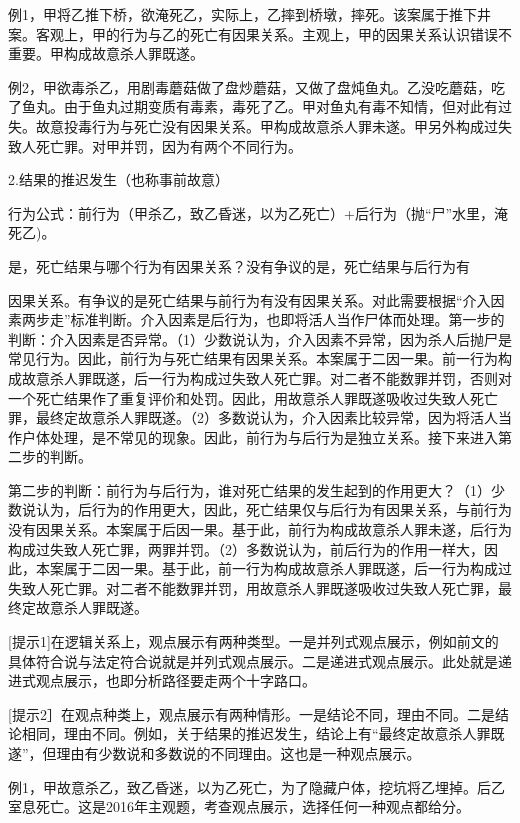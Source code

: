 例1，甲将乙推下桥，欲淹死乙，实际上，乙摔到桥墩，摔死。该案属于推下井案。客观上，甲的行为与乙的死亡有因果关系。主观上，甲的因果关系认识错误不重要。甲构成故意杀人罪既遂。

例2，甲欲毒杀乙，用剧毒蘑菇做了盘炒蘑菇，又做了盘炖鱼丸。乙没吃蘑菇，吃了鱼丸。由于鱼丸过期变质有毒素，毒死了乙。甲对鱼丸有毒不知情，但对此有过失。故意投毒行为与死亡没有因果关系。甲构成故意杀人罪未遂。甲另外构成过失致人死亡罪。对甲并罚，因为有两个不同行为。

2.结果的推迟发生（也称事前故意）

行为公式：前行为（甲杀乙，致乙昏迷，以为乙死亡）+后行为（抛“尸”水里，淹死乙)。

是，死亡结果与哪个行为有因果关系？没有争议的是，死亡结果与后行为有

因果关系。有争议的是死亡结果与前行为有没有因果关系。对此需要根据“介入因素两步走”标准判断。介入因素是后行为，也即将活人当作尸体而处理。第一步的判断：介入因素是否异常。（1）少数说认为，介入因素不异常，因为杀人后抛尸是常见行为。因此，前行为与死亡结果有因果关系。本案属于二因一果。前一行为构成故意杀人罪既遂，后一行为构成过失致人死亡罪。对二者不能数罪并罚，否则对一个死亡结果作了重复评价和处罚。因此，用故意杀人罪既遂吸收过失致人死亡罪，最终定故意杀人罪既遂。（2）多数说认为，介入因素比较异常，因为将活人当作户体处理，是不常见的现象。因此，前行为与后行为是独立关系。接下来进入第二步的判断。

第二步的判断：前行为与后行为，谁对死亡结果的发生起到的作用更大？（1）少数说认为，后行为的作用更大，因此，死亡结果仅与后行为有因果关系，与前行为没有因果关系。本案属于后因一果。基于此，前行为构成故意杀人罪未遂，后行为构成过失致人死亡罪，两罪并罚。（2）多数说认为，前后行为的作用一样大，因此，本案属于二因一果。基于此，前一行为构成故意杀人罪既遂，后一行为构成过失致人死亡罪。对二者不能数罪并罚，用故意杀人罪既遂吸收过失致人死亡罪，最终定故意杀人罪既遂。


[提示1]在逻辑关系上，观点展示有两种类型。一是并列式观点展示，例如前文的具体符合说与法定符合说就是并列式观点展示。二是递进式观点展示。此处就是递进式观点展示，也即分析路径要走两个十字路口。

[提示2］在观点种类上，观点展示有两种情形。一是结论不同，理由不同。二是结论相同，理由不同。例如，关于结果的推迟发生，结论上有“最终定故意杀人罪既遂”，但理由有少数说和多数说的不同理由。这也是一种观点展示。

例1，甲故意杀乙，致乙昏迷，以为乙死亡，为了隐藏户体，挖坑将乙埋掉。后乙室息死亡。这是2016年主观题，考查观点展示，选择任何一种观点都给分。

